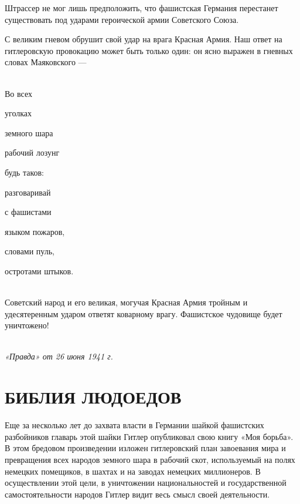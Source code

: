 \documentclass[12pt, a4paper, openany]{book}
\begin{document}
Штрассер не мог лишь предположить, что фашистская Германия перестанет существовать под ударами героической армии Советского Союза.

С великим гневом обрушит свой удар на врага Красная Армия. Наш ответ на гитлеровскую провокацию может быть только один: он ясно выражен в гневных словах Маяковского —

\ \\

\hangindent=2.5cm  Во всех

\hangindent=3.5cm  уголках

\hangindent=4.5cm  земного шара

\hangindent=2.5cm  рабочий лозунг

\hangindent=4.5cm  будь таков:

\hangindent=2.5cm  разговаривай

\hangindent=4.5cm  с фашистами

\hangindent=2.5cm  языком пожаров,

\hangindent=2.5cm  словами пуль,

\hangindent=4.5cm  остротами штыков.

\ \\

Советский народ и его великая, могучая Красная Армия тройным и удесятеренным ударом ответят коварному врагу. Фашистское чудовище будет уничтожено!

\ \\

\noindent\textit{«Правда» от 26 июня 1941 г.}

\newpage

	\section[Библия людоедов]{\center \textbf{БИБЛИЯ ЛЮДОЕДОВ}}



Еще за несколько лет до захвата власти в Германии шайкой фашистских разбойников главарь этой шайки Гитлер опубликовал свою книгу «Моя борьба». В этом бредовом произведении изложен гитлеровский план завоевания мира и превращения всех народов земного шара в рабочий скот, используемый на полях немецких помещиков, в шахтах и на заводах немецких миллионеров. В осуществлении этой цели, в уничтожении национальностей и государственной самостоятельности народов Гитлер видит весь смысл своей деятельности.
\end{document}
